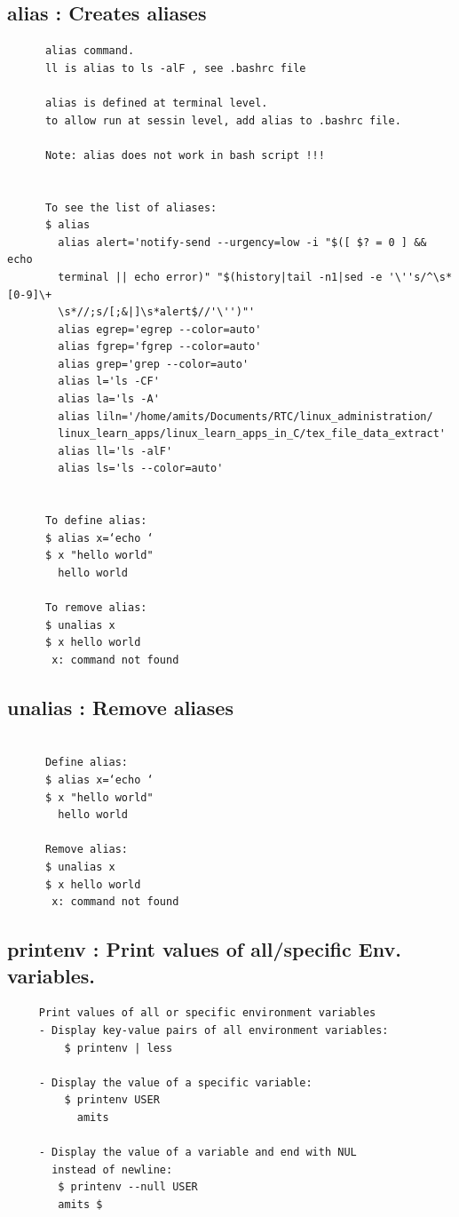 \documentclass[a4paper,12pt]{article}
\begin{document}
\subsection{alias   : Creates aliases }
\begin{verbatim}
      alias command.
      ll is alias to ls -alF , see .bashrc file	

      alias is defined at terminal level.
      to allow run at sessin level, add alias to .bashrc file.
      
      Note: alias does not work in bash script !!!


      To see the list of aliases:
﻿      $ alias
        alias alert='notify-send --urgency=low -i "$([ $? = 0 ] && echo        
        terminal || echo error)" "$(history|tail -n1|sed -e '\''s/^\s*[0-9]\+
        \s*//;s/[;&|]\s*alert$//'\'')"'
        alias egrep='egrep --color=auto'
        alias fgrep='fgrep --color=auto'
        alias grep='grep --color=auto'
        alias l='ls -CF'
        alias la='ls -A'
        alias liln='/home/amits/Documents/RTC/linux_administration/       
        linux_learn_apps/linux_learn_apps_in_C/tex_file_data_extract'
        alias ll='ls -alF'
        alias ls='ls --color=auto'


      To define alias: 
      $ alias x=‘echo ‘
      $ x "hello world"
        hello world

      To remove alias:
      $ unalias x
      $ x hello world
       x: command not found

\end{verbatim}

\subsection{unalias   : Remove aliases }
\begin{verbatim}

      Define alias: 
      $ alias x=‘echo ‘
      $ x "hello world"
        hello world

      Remove alias:
      $ unalias x
      $ x hello world
       x: command not found

\end{verbatim}


\subsection{printenv   : Print values of all/specific Env. variables. }
\begin{verbatim}
     Print values of all or specific environment variables
     - Display key-value pairs of all environment variables:
         $ printenv | less

     - Display the value of a specific variable:
         $ printenv USER
           amits

     - Display the value of a variable and end with NUL 
       instead of newline:
        $ printenv --null USER
        amits $
\end{verbatim}
\end{document}
